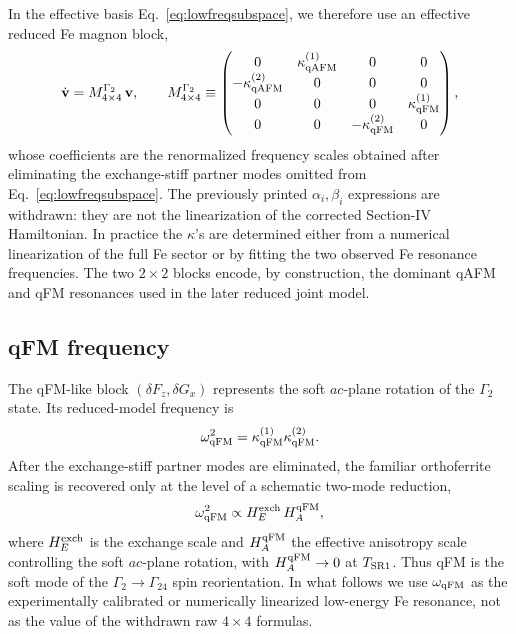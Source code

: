 \documentclass[reprint,amsmath,amssymb,aps,prb,longbibliography]{revtex4-2}
\newcommand{\fix}[1]{#1}
\begin{document}
In the effective basis Eq.~\eqref{eq:lowfreqsubspace}, we therefore use
an effective reduced Fe magnon block,
\begin{equation}
\dot{\mathbf v} = M^{\Gamma_2}_{4\times 4}\,\mathbf v,
\qquad
M^{\Gamma_2}_{4\times 4} \equiv
\begin{pmatrix}
0 & \kappa_{\rm qAFM}^{(1)} & 0 & 0 \\
-\kappa_{\rm qAFM}^{(2)} & 0 & 0 & 0 \\
0 & 0 & 0 & \kappa_{\rm qFM}^{(1)} \\
0 & 0 & -\kappa_{\rm qFM}^{(2)} & 0
\end{pmatrix},
\label{eq:M4x4}
\end{equation}
whose coefficients are the renormalized frequency scales obtained after
eliminating the exchange-stiff partner modes omitted from
Eq.~\eqref{eq:lowfreqsubspace}. \fix{The previously printed
$\alpha_i,\beta_i$ expressions are withdrawn: they are not the
linearization of the corrected Section-IV Hamiltonian.} In practice the
$\kappa$'s are determined either from a numerical linearization of the
full Fe sector or by fitting the two observed Fe resonance frequencies.
The two $2\times 2$ blocks encode, by construction, the dominant qAFM
and qFM resonances used in the later reduced joint model.

\subsection{qFM frequency}

The qFM-like block $(\delta F_z, \delta G_x)$ represents the soft
$ac$-plane rotation of the $\Gamma_2$ state. Its reduced-model
frequency is
\begin{equation}
\omega_{\rm qFM}^2 = \kappa_{\rm qFM}^{(1)}\kappa_{\rm qFM}^{(2)}.
\label{eq:omqFMexact}
\end{equation}
After the exchange-stiff partner modes are eliminated, the familiar
orthoferrite scaling is recovered only at the level of a schematic
two-mode reduction,
\begin{equation}
\omega_{\rm qFM}^2 \propto H_E^{\rm exch}\,H_A^{\rm qFM},
\label{eq:omqFM}
\end{equation}
where $H_E^{\rm exch}$ is the exchange scale and $H_A^{\rm qFM}$ the
effective anisotropy scale controlling the soft $ac$-plane rotation,
with $H_A^{\rm qFM}\to 0$ at $T_{\rm SR1}$. Thus qFM is the soft mode
of the $\Gamma_2\to\Gamma_{24}$ spin reorientation. In what follows we
use $\omega_{\rm qFM}$ as the experimentally calibrated or numerically
linearized low-energy Fe resonance, not as the value of the withdrawn
raw $4\times4$ formulas.
\end{document}
